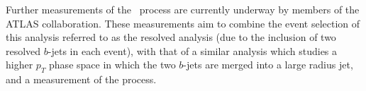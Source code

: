 Further measurements of the \VHbb\ process are currently underway by members of
the ATLAS collaboration. These measurements aim to combine the event selection
of this analysis referred to as the resolved analysis (due to the inclusion of
two resolved $b$-jets in each event), with that of a similar analysis which
studies a higher $p_T$ phase space in which the two $b$-jets are merged into a
large radius jet, and a measurement of the \VHcc process. 